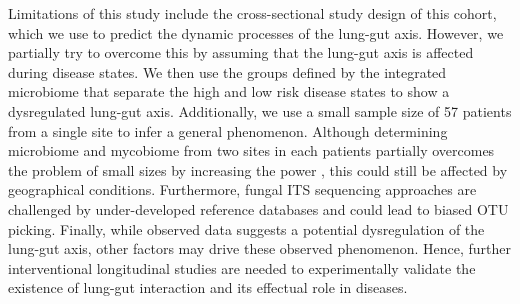 Limitations of this study include the cross-sectional study design of this cohort, which we use to predict the dynamic processes of the lung-gut axis. However, we partially try to overcome this by assuming that the lung-gut axis is affected during disease states. We then use the groups defined by the integrated microbiome that separate the high and low risk disease states to show a dysregulated lung-gut axis. Additionally, we use a small sample size of 57 patients from a single site to infer a general phenomenon. Although determining microbiome and mycobiome from two sites in each patients partially overcomes the problem of small sizes by increasing the power \cite{Li2018}, this could still be affected by geographical conditions. Furthermore, fungal ITS sequencing approaches are challenged by under-developed reference databases and could lead to biased OTU picking. Finally, while observed data suggests a potential dysregulation of the lung-gut axis, other factors may drive these observed phenomenon. Hence, further interventional longitudinal studies are needed to experimentally validate the existence of lung-gut interaction and its effectual role in diseases.
